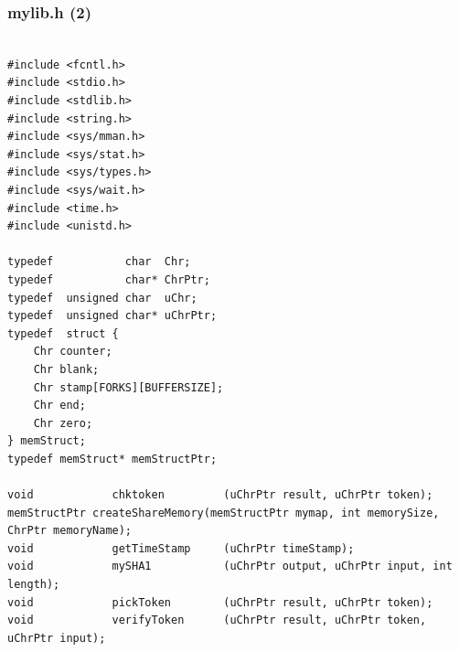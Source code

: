 \documentclass[xcolor=table, notheorems, hyperref={pdfpagelabels=false}]{beamer}
\begin{document}
\begin{frame}[fragile]
\frametitle{mylib.h (2)}
\begin{lstlisting}[basicstyle=\ttfamily\tiny]         % 108

#include <fcntl.h>
#include <stdio.h>
#include <stdlib.h>
#include <string.h>
#include <sys/mman.h>
#include <sys/stat.h>
#include <sys/types.h>
#include <sys/wait.h>
#include <time.h>
#include <unistd.h>

typedef           char  Chr;
typedef           char* ChrPtr;
typedef  unsigned char  uChr;
typedef  unsigned char* uChrPtr;
typedef  struct {
    Chr counter;
    Chr blank;
    Chr stamp[FORKS][BUFFERSIZE];
    Chr end;
    Chr zero;
} memStruct;
typedef memStruct* memStructPtr;

void            chktoken         (uChrPtr result, uChrPtr token);
memStructPtr createShareMemory(memStructPtr mymap, int memorySize, ChrPtr memoryName);
void            getTimeStamp     (uChrPtr timeStamp);
void            mySHA1           (uChrPtr output, uChrPtr input, int length);
void            pickToken        (uChrPtr result, uChrPtr token);
void            verifyToken      (uChrPtr result, uChrPtr token, uChrPtr input);

\end{lstlisting}
\end{frame}
\end{document}
